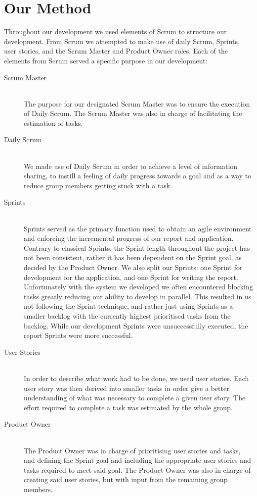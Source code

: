 \section{Our Method}
Throughout our development we used elements of Scrum to structure our development.
From Scrum we attempted to make use of daily Scrum, Sprints, user stories, and the Scrum Master and Product Owner roles.
Each of the elements from Scrum served a specific purpose in our development:
\begin{description}
    \item [Scrum Master] \hfill \\
    The purpose for our designated Scrum Master was to ensure the execution of Daily Scrum.
    The Scrum Master was also in charge of facilitating the estimation of tasks.
    \item [Daily Scrum] \hfill \\
    We made use of Daily Scrum in order to achieve a level of information sharing, to instill a feeling of daily progress towards a goal and as a way to reduce group members getting stuck with a task.
    \item [Sprints] \hfill \\
    Sprints served as the primary function used to obtain an agile environment and enforcing the incremental progress of our report and application.
    Contrary to classical Sprints, the Sprint length throughout the project has not been consistent, rather it has been dependent on the Sprint goal, as decided by the Product Owner.
    We also split our Sprints: one Sprint for development for the application, and one Sprint for writing the report.
    Unfortunately with the system we developed we often encountered blocking tasks greatly reducing our ability to develop in parallel.
    This resulted in us not following the Sprint technique, and rather just using Sprints as a smaller backlog with the currently highest prioritised tasks from the backlog.
    While our development Sprints were unsuccessfully executed, the report Sprints were more successful.
    \item [User Stories] \hfill \\
    In order to describe what work had to be done, we used user stories.
    Each user story was then derived into smaller tasks in order give a better understanding of what was necessary to complete a given user story.
    The effort required to complete a task was estimated by the whole group.
    \item [Product Owner] \hfill \\
    The Product Owner was in charge of prioritising user stories and tasks, and defining the Sprint goal and including the appropriate user stories and tasks required to meet said goal.
    The Product Owner was also in charge of creating said user stories, but with input from the remaining group members.
\end{description}


